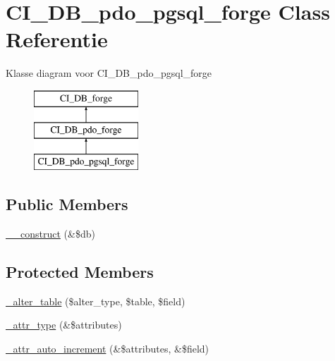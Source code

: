 \hypertarget{class_c_i___d_b__pdo__pgsql__forge}{}\section{C\+I\+\_\+\+D\+B\+\_\+pdo\+\_\+pgsql\+\_\+forge Class Referentie}
\label{class_c_i___d_b__pdo__pgsql__forge}
Klasse diagram voor C\+I\+\_\+\+D\+B\+\_\+pdo\+\_\+pgsql\+\_\+forge\begin{figure}[H]
\begin{center}
\leavevmode
\includegraphics[height=3.000000cm]{class_c_i___d_b__pdo__pgsql__forge}
\end{center}
\end{figure}
\subsection*{Public Members}
\begin{DoxyCompactItemize}
\item 
\mbox{\hyperlink{class_c_i___d_b__pdo__pgsql__forge_aaf2ef772755ec6f361d44e16cc9ffd69}{\+\_\+\+\_\+construct}} (\&\$db)
\end{DoxyCompactItemize}
\subsection*{Protected Members}
\begin{DoxyCompactItemize}
\item 
\mbox{\hyperlink{class_c_i___d_b__pdo__pgsql__forge_a41c6cae02f2fda8b429ad0afb9509426}{\+\_\+alter\+\_\+table}} (\$alter\+\_\+type, \$table, \$field)
\item 
\mbox{\hyperlink{class_c_i___d_b__pdo__pgsql__forge_a8553be952084c6f7cdfff370a1d14f6b}{\+\_\+attr\+\_\+type}} (\&\$attributes)
\item 
\mbox{\hyperlink{class_c_i___d_b__pdo__pgsql__forge_a2a013a5932439c3c44f0dad3436525f7}{\+\_\+attr\+\_\+auto\+\_\+increment}} (\&\$attributes, \&\$field)
\end{DoxyCompactItemize}
